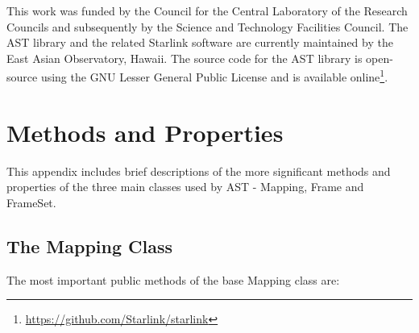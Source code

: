 \documentclass[final,authoryear,5p,times,twocolumn]{elsarticle}
\begin{document}
This work was funded by the Council for the Central Laboratory of the
Research Councils and subsequently by the Science and Technology
Facilities Council.  The AST library and the related Starlink software
are currently maintained by the East Asian Observatory, Hawaii. The
source code for the AST library is open-source using the GNU Lesser General
Public License and is available
online\footnote{\url{https://github.com/Starlink/starlink}}.


\appendix

\section{Methods and Properties}
\label{app:classes}

This appendix includes brief descriptions of the more significant methods
and properties of the three main classes used by AST - Mapping, Frame and
FrameSet.

\subsection{The Mapping Class}
The most important public methods of the base Mapping class are:
\end{document}
